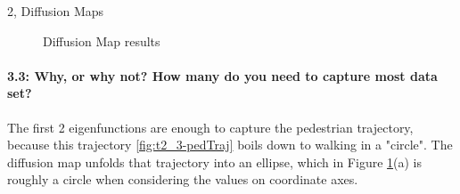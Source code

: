 \begin{task}{2, Diffusion Maps}
\begin{figure}[H]
\centering
{}
\caption{Diffusion Map results}
\label{fig:t2_3-dmap}
\end{figure}

\paragraph{3.3: Why, or why not? How many do you need to capture most data set?}
The first 2 eigenfunctions are enough to capture the pedestrian trajectory, because this trajectory \ref{fig:t2_3-pedTraj} boils down to walking in a "circle". The diffusion map unfolds that trajectory into an ellipse, which in Figure \ref{fig:t2_3-dmap}(a) is roughly a circle when considering the values on coordinate axes.


\end{task}
